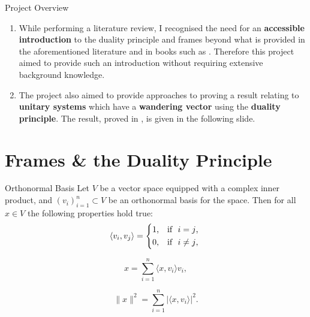 \documentclass{beamer}
\begin{document}
\begin{frame}{Project Overview}

\begin{enumerate}
    \item While performing a literature review, I recognised the need for an \textbf{accessible introduction} to the duality principle and frames beyond what is provided in the aforementioned literature and in books such as \textbf{\cite{christensen2008frames}}. Therefore this project aimed to provide such an introduction without requiring extensive background knowledge. 
    \item The project also aimed to provide approaches to proving a result relating to \textbf{unitary systems} which have a \textbf{wandering vector} using the \textbf{duality principle}. The result, proved in \textbf{\cite{HL2000}}, is given in the following slide.
\end{enumerate}
\end{frame}


\section{Frames \& the Duality Principle}

\begin{frame}{Orthonormal Basis}
Let $V$ be a vector space equipped with a complex inner product, and $(v_i)_{i = 1}^n \subset V$ be an orthonormal basis for the space. Then for all $x \in V$ the following properties hold true:
    \begin{equation} \label{ortho_prop}
    \langle v_i, v_j \rangle = 
        \begin{dcases*}
        $1,$ & \mbox{if } $i = j$, \\
        $0,$ & \mbox{if } $i \neq j$,
        \end{dcases*}
\end{equation}

\begin{equation} \label{perf_rep_orth}
    x = \sum_{i = 1}^n\langle x, v_i \rangle v_i,
\end{equation}

\begin{equation} \label{parseval_eq}
    \|x\|^2 = \sum_{i = 1}^n |\langle x, v_i \rangle|^2.
\end{equation}
\end{frame}
\end{document}
